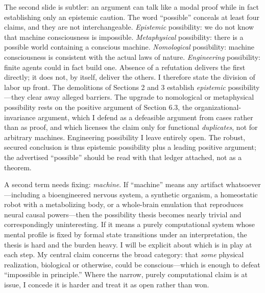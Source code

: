 \documentclass[11pt]{article}
\begin{document}
The second slide is subtler: an argument can talk like a modal proof while in fact establishing only an epistemic caution. The word ``possible'' conceals at least four claims, and they are not interchangeable. \emph{Epistemic} possibility: we do not know that machine consciousness is impossible. \emph{Metaphysical} possibility: there is a possible world containing a conscious machine. \emph{Nomological} possibility: machine consciousness is consistent with the actual laws of nature. \emph{Engineering} possibility: finite agents could in fact build one. Absence of a refutation delivers the first directly; it does not, by itself, deliver the others. I therefore state the division of labor up front. The demolitions of Sections 2 and 3 establish \emph{epistemic} possibility---they clear away alleged barriers. The upgrade to nomological or metaphysical possibility rests on the positive argument of Section 6.3, the organizational-invariance argument, which I defend as a defeasible argument from cases rather than as proof, and which licenses the claim only for functional \emph{duplicates}, not for arbitrary machines. Engineering possibility I leave entirely open. The robust, secured conclusion is thus epistemic possibility plus a leading positive argument; the advertised ``possible'' should be read with that ledger attached, not as a theorem.

A second term needs fixing: \emph{machine}. If ``machine'' means any artifact whatsoever---including a bioengineered nervous system, a synthetic organism, a homeostatic robot with a metabolizing body, or a whole-brain emulation that reproduces neural causal powers---then the possibility thesis becomes nearly trivial and correspondingly uninteresting. If it means a purely computational system whose mental profile is fixed by formal state transitions under an interpretation, the thesis is hard and the burden heavy. I will be explicit about which is in play at each step. My central claim concerns the broad category: that \emph{some} physical realization, biological or otherwise, could be conscious---which is enough to defeat ``impossible in principle.'' Where the narrow, purely computational claim is at issue, I concede it is harder and treat it as open rather than won.
\end{document}
